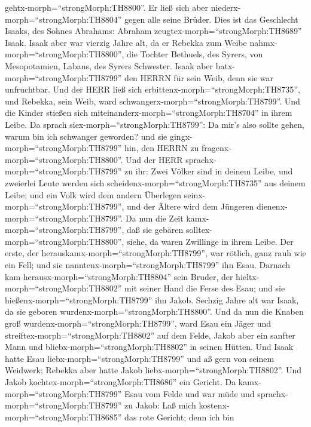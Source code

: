 gehtx-morph=``strongMorph:TH8800''. Er ließ sich aber
niederx-morph=``strongMorph:TH8804'' gegen alle seine Brüder.
 Dies ist das Geschlecht Isaaks, des Sohnes Abrahams:
Abraham zeugtex-morph=``strongMorph:TH8689'' Isaak.  Isaak
aber war vierzig Jahre alt, da er Rebekka zum Weibe
nahmx-morph=``strongMorph:TH8800'', die Tochter Bethuels, des Syrers,
von Mesopotamien, Labans, des Syrers Schwester.  Isaak aber
batx-morph=``strongMorph:TH8799'' den HERRN für sein Weib, denn sie war
unfruchtbar. Und der HERR ließ sich
erbittenx-morph=``strongMorph:TH8735'', und Rebekka, sein Weib, ward
schwangerx-morph=``strongMorph:TH8799''.  Und die Kinder
stießen sich miteinanderx-morph=``strongMorph:TH8704'' in ihrem Leibe.
Da sprach siex-morph=``strongMorph:TH8799'': Da mir's also sollte gehen,
warum bin ich schwanger geworden? und sie
gingx-morph=``strongMorph:TH8799'' hin, den HERRN zu
fragenx-morph=``strongMorph:TH8800''.  Und der HERR
sprachx-morph=``strongMorph:TH8799'' zu ihr: Zwei Völker sind in deinem
Leibe, und zweierlei Leute werden sich
scheidenx-morph=``strongMorph:TH8735'' aus deinem Leibe; und ein Volk
wird dem andern Überlegen seinx-morph=``strongMorph:TH8799'', und der
Ältere wird dem Jüngeren dienenx-morph=``strongMorph:TH8799''.
 Da nun die Zeit kamx-morph=``strongMorph:TH8799'', daß sie
gebären solltex-morph=``strongMorph:TH8800'', siehe, da waren Zwillinge
in ihrem Leibe.  Der erste, der
herauskamx-morph=``strongMorph:TH8799'', war rötlich, ganz rauh wie ein
Fell; und sie nanntenx-morph=``strongMorph:TH8799'' ihn Esau.
 Darnach kam herausx-morph=``strongMorph:TH8804'' sein
Bruder, der hieltx-morph=``strongMorph:TH8802'' mit seiner Hand die
Ferse des Esau; und sie hießenx-morph=``strongMorph:TH8799'' ihn Jakob.
Sechzig Jahre alt war Isaak, da sie geboren
wurdenx-morph=``strongMorph:TH8800''.  Und da nun die
Knaben groß wurdenx-morph=``strongMorph:TH8799'', ward Esau ein Jäger
und streiftex-morph=``strongMorph:TH8802'' auf dem Felde, Jakob aber ein
sanfter Mann und bliebx-morph=``strongMorph:TH8802'' in seinen Hütten.
 Und Isaak hatte Esau liebx-morph=``strongMorph:TH8799''
und aß gern von seinem Weidwerk; Rebekka aber hatte Jakob
liebx-morph=``strongMorph:TH8802''.  Und Jakob
kochtex-morph=``strongMorph:TH8686'' ein Gericht. Da
kamx-morph=``strongMorph:TH8799'' Esau vom Felde und war müde
 und sprachx-morph=``strongMorph:TH8799'' zu Jakob: Laß
mich kostenx-morph=``strongMorph:TH8685'' das rote Gericht; denn ich bin
